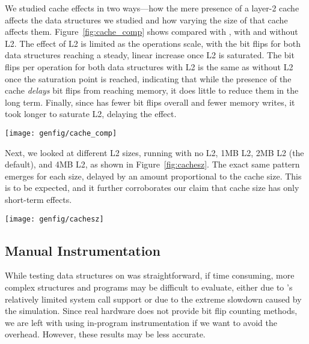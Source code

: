 We studied cache effects in two ways---how the mere presence of a layer-2
cache affects the data structures we studied and how varying the size
of that cache affects them. Figure~\ref{fig:cache_comp} shows \xrbt compared
with \rbt, with and without L2. The effect of L2 is limited as the
operations scale, with the bit flips for both data structures reaching a steady,
linear increase once L2 is saturated. The bit flips per operation for both data
structures with L2 is the same as without L2 once the saturation point is
reached, indicating that while the presence of the cache \textit{delays} bit
flips from reaching memory, it does little to reduce them in the long term.
Finally, since \xrbt has fewer bit flips overall and fewer memory writes, it
took longer to saturate L2, delaying the effect.


\begin{SCfigure}
	\centering
	\texttt{[image: genfig/cache\_comp]}
	\caption[XOR red-black tree bits flipped]{Bits flipped by XOR red-black trees and standard red-black trees over a varying number of sequential
		inserts, with and without the L2 cache present.}
	\label{fig:cache_comp}
\end{SCfigure}

Next, we looked at different L2 sizes, running \xrbt with no L2, 1MB L2, 2MB L2
(the default), and 4MB L2, as shown in Figure~\ref{fig:cachesz}. The exact same
pattern emerges for each size, delayed by an amount proportional to the cache
size. This is to be expected, and it further corroborates our claim that cache
size has only short-term effects.

\begin{SCfigure}
	\centering
	\texttt{[image: genfig/cachesz]}
	\caption[XOR red-black tree bits flipped (varying cache)]{Bits flipped by XOR red-black tree over a varying number of sequential
		inserts, with different sizes for L2.}
	\label{fig:cachesz}
\end{SCfigure}



\subsection{Manual Instrumentation}

While testing data structures on \gem was straightforward, if time
consuming, more complex structures and programs may be difficult to
evaluate, either due to \gem's relatively limited system call support or due to
the extreme slowdown caused by the simulation. Since real hardware does not
provide bit flip counting methods, we are left with using in-program
instrumentation if we want to avoid the \gem overhead. However, these results
may be less accurate.

